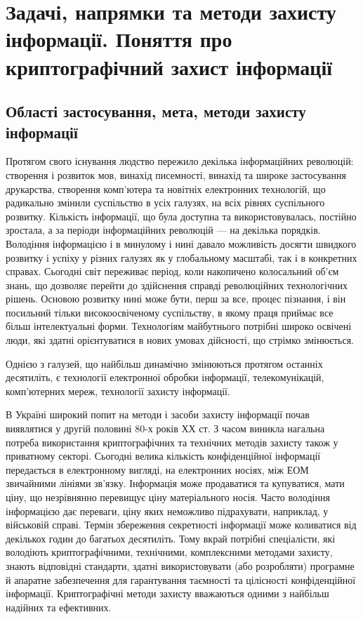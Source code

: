 \chapter{Задачі, напрямки та методи захисту інформації.
    Поняття про криптографічний захист інформації}\label{lecture:1}
\section{Області застосування, мета, методи захисту інформації}
Протягом свого існування людство пережило декілька інформаційних революцій:
створення і розвиток мов, винахід писемності, винахід та широке застосування
друкарства, створення комп’ютера та новітніх електронних технологій, що
радикально змінили суспільство в усіх галузях, на всіх рівнях  суспільного
розвитку. Кількість інформації, що була доступна та використовувалась, постійно
зростала, а за періоди інформаційних революцій --- на декілька порядків.
Володіння інформацією і в минулому і нині давало можливість досягти швидкого
розвитку і успіху у різних галузях як у глобальному масштабі, так і в
конкретних справах. Сьогодні світ переживає період, коли накопичено колосальний
об’єм знань, що  дозволяє перейти до здійснення справді революційних
технологічних рішень. Основою розвитку  нині може бути, перш за все, процес
пізнання, і він посильний тільки високоосвіченому суспільству, в якому праця
приймає все більш інтелектуальні форми. Технологіям майбутнього потрібні широко
освічені люди, які здатні орієнтуватися в нових умовах дійсності, що стрімко
змінюється.

Однією з галузей, що  найбільш динамічно  змінюються  протягом останніх
десятиліть, є технології електронної обробки інформації, телекомунікацій,
комп’ютерних мереж, технології захисту інформації.

В Україні широкий попит на методи і засоби захисту інформації почав виявлятися у
другій половині 80-х років ХХ ст. З часом виникла нагальна потреба використання
криптографічних та технічних методів захисту також у приватному секторі.
Сьогодні велика кількість конфіденційної інформації передається в електронному
вигляді, на електронних носіях, між ЕОМ звичайними лініями зв’язку. Інформація
може продаватися та купуватися, мати ціну, що незрівнянно перевищує ціну
матеріального носія. Часто володіння інформацією дає переваги, ціну яких
неможливо підрахувати, наприклад, у військовій справі. Термін збереження
секретності інформації може коливатися від декількох годин до багатьох
десятиліть. Тому вкрай потрібні спеціалісти, які володіють  криптографічними,
технічними, комплексними методами захисту, знають відповідні стандарти, здатні
використовувати (або розробляти) програмне й апаратне забезпечення для
гарантування таємності та цілісності конфіденційної інформації. Криптографічні
методи захисту вважаються одними з найбільш надійних та ефективних. 

